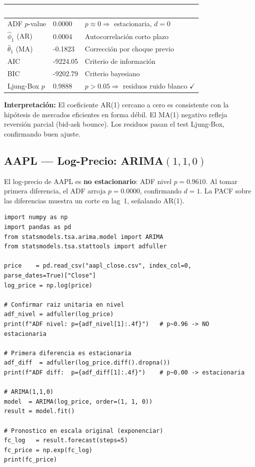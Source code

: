 \documentclass[12pt,letterpaper]{article}
\begin{document}
\begin{center}
\renewcommand{\arraystretch}{1.3}
\begin{tabular}{@{}L{3.2cm}L{3.2cm}L{4.0cm}@{}}
\toprule
{}\textcolor{white}{\textbf{Métrica}} &
\textcolor{white}{\textbf{Valor}} &
\textcolor{white}{\textbf{Interpretación}} \\
\midrule
{} ADF $p$-value & 0.0000 & $p\approx 0 \Rightarrow$ estacionaria, $d=0$ \\
$\hat\phi_1$ (AR) & 0.0004 & Autocorrelación corto plazo \\
 $\hat\theta_1$ (MA) & -0.1823 & Corrección por choque previo \\
AIC & -9224.05 & Criterio de información \\
 BIC & -9202.79 & Criterio bayesiano \\
Ljung-Box $p$ & 0.9888 & $p>0.05 \Rightarrow$ residuos ruido blanco $\checkmark$ \\
\bottomrule
\end{tabular}
\end{center}

\textbf{Interpretación:} El coeficiente AR(1) cercano a cero es consistente con la hipótesis
de mercados eficientes en forma débil. El MA(1) negativo refleja reversión parcial
(bid-ask bounce). Los residuos pasan el test Ljung-Box, confirmando buen ajuste.

\subsection{AAPL --- Log-Precio: ARIMA$(1,1,0)$}

El log-precio de AAPL es \textbf{no estacionario}: ADF nivel $p=0.9610$.
Al tomar primera diferencia, el ADF arroja $p=0.0000$, confirmando $d=1$.
La PACF sobre las diferencias muestra un corte en lag~1, señalando AR(1).

\begin{lstlisting}[caption={Ejemplo 2: AAPL log-precio ARIMA(1,1,0)}]
import numpy as np
import pandas as pd
from statsmodels.tsa.arima.model import ARIMA
from statsmodels.tsa.stattools import adfuller

price    = pd.read_csv("aapl_close.csv", index_col=0, parse_dates=True)["Close"]
log_price = np.log(price)

# Confirmar raiz unitaria en nivel
adf_nivel = adfuller(log_price)
print(f"ADF nivel: p={adf_nivel[1]:.4f}")   # p~0.96 -> NO estacionaria

# Primera diferencia es estacionaria
adf_diff  = adfuller(log_price.diff().dropna())
print(f"ADF diff:  p={adf_diff[1]:.4f}")    # p~0.00 -> estacionaria

# ARIMA(1,1,0)
model  = ARIMA(log_price, order=(1, 1, 0))
result = model.fit()

# Pronostico en escala original (exponenciar)
fc_log   = result.forecast(steps=5)
fc_price = np.exp(fc_log)
print(fc_price)
\end{lstlisting}
\end{document}
